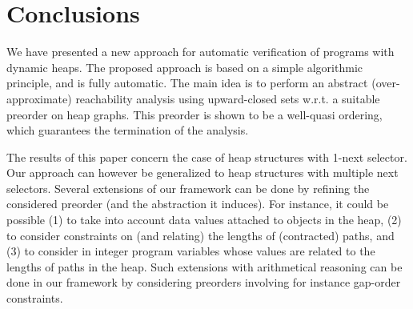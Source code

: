 \section{Conclusions}
\label{conclusion:section}
 
We have presented a new approach for automatic verification of
programs with dynamic heaps.  The proposed approach is based on a
simple algorithmic principle, and is fully automatic.  The main idea
is to perform an abstract (over-approximate) reachability analysis
using upward-closed sets w.r.t. a suitable preorder on heap
graphs. This preorder is shown to be a well-quasi ordering, which
guarantees the termination of the
analysis. %

The results of this paper concern the case of heap structures with
1-next selector. Our approach can however be generalized to heap
structures with multiple next selectors. Several extensions of our
framework can be done by refining the considered preorder (and the
abstraction it induces). For instance, it could be possible (1) to
take into account data values attached to objects in the heap, (2) to
consider constraints on (and relating) the lengths of (contracted)
paths, and (3) to consider in integer program variables whose values
are related to the lengths of paths in the heap. Such extensions with
arithmetical reasoning can be done in our framework by considering
preorders involving for instance
 gap-order constraints.
